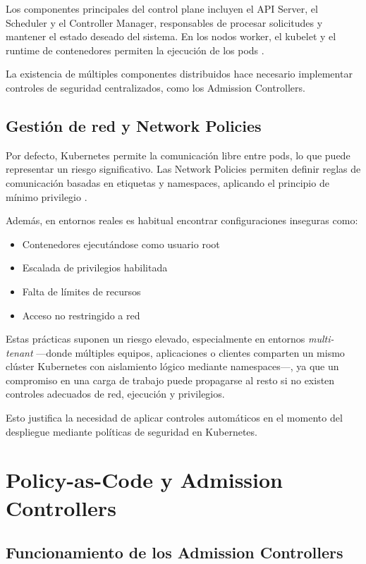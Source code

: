 Los componentes principales del control plane incluyen el API Server, el Scheduler y el Controller Manager, responsables de procesar solicitudes y mantener el estado deseado del sistema. En los nodos worker, el kubelet y el runtime de contenedores permiten la ejecución de los pods \cite{kubernetes_docs}.

La existencia de múltiples componentes distribuidos hace necesario implementar controles de seguridad centralizados, como los Admission Controllers.

\subsection{Gestión de red y Network Policies}

Por defecto, Kubernetes permite la comunicación libre entre pods, lo que puede representar un riesgo significativo. Las Network Policies permiten definir reglas de comunicación basadas en etiquetas y namespaces, aplicando el principio de mínimo privilegio \cite{kubernetes_docs}.

Además, en entornos reales es habitual encontrar configuraciones inseguras como:

\begin{itemize}
\item Contenedores ejecutándose como usuario root
\item Escalada de privilegios habilitada
\item Falta de límites de recursos
\item Acceso no restringido a red
\end{itemize}

Estas prácticas suponen un riesgo elevado, especialmente en entornos \textit{multi-tenant} —donde múltiples equipos, aplicaciones o clientes comparten un mismo clúster Kubernetes con aislamiento lógico mediante namespaces—, ya que un compromiso en una carga de trabajo puede propagarse al resto si no existen controles adecuados de red, ejecución y privilegios.

Esto justifica la necesidad de aplicar controles automáticos en el momento del despliegue mediante políticas de seguridad en Kubernetes.

\section{Policy-as-Code y Admission Controllers}

\subsection{Funcionamiento de los Admission Controllers}

